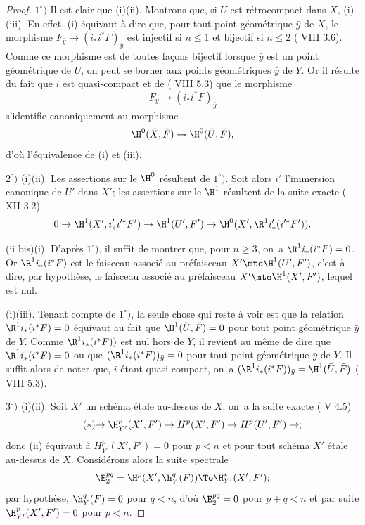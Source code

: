 \skpt
\begin{proof}
$1^\circ)$ Il est clair que \textup{(i)}\SSI \textup{(ii)}.
Montrons que, si $U$ est r\'etrocompact dans $X$, \textup{(i)}\SSI
\textup{(iii)}. En effet, \textup{(i)} \'equivaut \`a dire que, pour
tout point g\'eom\'etrique $\bar{y}$ de $X$, le morphisme
$F_{\bar{y}}\to (i_*i^*F)_{\bar{y}}$ est injectif si $n\leq 1$ et
bijectif si $n\leq 2$ ( VIII 3.6). Comme ce morphisme est de
toutes fa\c cons bijectif lorsque $\bar{y}$ est un point
g\'eom\'etrique de $U$, on peut se borner aux points g\'eom\'etriques
$\bar{y}$ de $Y$. Or il r\'esulte du fait que $i$ est quasi-compact
et de ( VIII 5.3) que le morphisme
$$F_{\bar{y}}\to (i_*i^*F)_{\bar{y}}$$
s'identifie canoniquement au morphisme
$$
\H^0(\bar{X}, \bar{F})\to \H^0(\bar{U}, \bar{F}),
$$
d'o\`u l'\'equivalence de \textup{(i)} et \textup{(iii)}.

$2^\circ)$ \textup{(i)}\ALORS \textup{(ii)}. Les assertions sur le $\H^0$ r\'esultent de $1^\circ)$. Soit alors $i'$ l'immersion canonique de $U'$ dans $X'$; les assertions sur le $\H^1$ r\'esultent de la suite exacte ( XII 3.2)
$$0\to \H^1(X', i'_*i'^*F')\to \H^1(U', F')\to \H^0(X', \R^1i'_*(i'^*F')).
$$

(ii bis)\ALORS \textup{(i)}\pageoriginale. D'apr\`es $1^\circ)$, il suffit de montrer que, pour $n\geq 3$, on~a $\R^1i_*(i^*F)=0$. Or $\R^1i_*(i^*F)$ est le faisceau associ\'e au pr\'efaisceau $X'\mto \H^1(U', F')$, c'est-\`a-dire, par hypoth\`ese, le faisceau associ\'e au pr\'efaisceau $X'\mto \H^1(X', F')$, lequel est nul.

\textup{(i)}\SSI \textup{(iii)}. Tenant compte de $1^\circ)$, la seule chose qui reste \`a voir est que la relation $\R^1i_*(i^*F)=0$ \'equivaut au fait que $\H^1(\bar U, \bar F)=0$ pour tout point g\'eom\'etrique $\bar y$ de $Y$. Comme $\R^1i_*(i^*F))$ est nul hors de $Y$, il revient au m\^eme de dire que $\R^1i_*(i^*F)=0$ ou que $(\R^1i_*(i^*F))_{\bar y}=0$ pour tout point g\'eom\'etrique $\bar y$ de $Y$. Il suffit alors de noter que, $i$ \'etant quasi-compact, on~a $(\R^1i_*(i^*F))_{\bar y}=\H^1(\bar U, \bar F)$ ( VIII 5.3).

$3^\circ)$ \textup{(i)}\ALORS \textup{(ii)}. Soit $X'$ un sch\'ema \'etale au-dessus de $X$; on~a la suite exacte ( V 4.5)
\begin{equation*} \label{eq:XIV.1.1.*} \tag{$*$} {\to \H^p_{Y'}(X', F')\to H^p(X', F')\to H^p(U', F')\to};
\end{equation*}
donc \textup{(ii)} \'equivaut \`a $H^p_{Y'}(X', F')=0$ pour $p<n$ et pour tout sch\'ema $X'$ \'etale au-dessus de $X$. Consid\'erons alors la suite spectrale
$$
\E_2^{pq}=\H^p(X', {\h}_Y^q(F))\To \H_{Y'}^*(X', F');$$
par hypoth\`ese, ${\h}_Y^q(F)=0$ pour $q<n$, d'o\`u $\E_2^{pq}=0$ pour $p+q<n$ et par suite $\H_{Y'}^p(X', F')=0$ pour $p<n$.


\end{proof}
